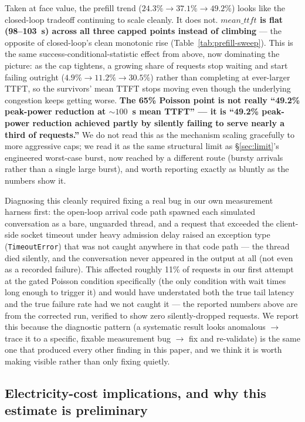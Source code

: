 \documentclass[sigconf,review,anonymous]{acmart}
\begin{document}
Taken at face value, the prefill trend ($24.3\%\rightarrow37.1\%\rightarrow49.2\%$) looks
like the closed-loop tradeoff continuing to scale cleanly. It does not.
\textbf{$\mathit{mean\_ttft}$ is flat (98--103~s) across all three capped points instead of
climbing} --- the opposite of closed-loop's clean monotonic rise
(Table~\ref{tab:prefill-sweep}). This is the same success-conditional-statistic effect from
above, now dominating the picture: as the cap tightens, a growing share of requests stop
waiting and start failing outright ($4.9\%\rightarrow11.2\%\rightarrow30.5\%$) rather than
completing at ever-larger TTFT, so the survivors' mean TTFT stops moving even though the
underlying congestion keeps getting worse. \textbf{The 65\% Poisson point is not really
``49.2\% peak-power reduction at ${\sim}100$~s mean TTFT'' --- it is ``49.2\% peak-power
reduction achieved partly by silently failing to serve nearly a third of requests.''} We do
not read this as the mechanism scaling gracefully to more aggressive caps; we read it as the
same structural limit as \S\ref{sec:limit}'s engineered worst-case burst, now reached by a
different route (bursty arrivals rather than a single large burst), and worth reporting
exactly as bluntly as the numbers show it.

Diagnosing this cleanly required fixing a real bug in our own measurement harness first: the
open-loop arrival code path spawned each simulated conversation as a bare, unguarded thread,
and a request that exceeded the client-side socket timeout under heavy admission delay raised
an exception type (\texttt{TimeoutError}) that was not caught anywhere in that code path ---
the thread died silently, and the conversation never appeared in the output at all (not even
as a recorded failure). This affected roughly 11\% of requests in our first attempt at the
gated Poisson condition specifically (the only condition with wait times long enough to
trigger it) and would have understated both the true tail latency and the true failure rate
had we not caught it --- the reported numbers above are from the corrected run, verified to
show zero silently-dropped requests. We report this because the diagnostic pattern (a
systematic result looks anomalous $\rightarrow$ trace it to a specific, fixable measurement
bug $\rightarrow$ fix and re-validate) is the same one that produced every other finding in
this paper, and we think it is worth making visible rather than only fixing quietly.

\subsection{Electricity-cost implications, and why this estimate is preliminary}
\label{sec:cost}
\end{document}
